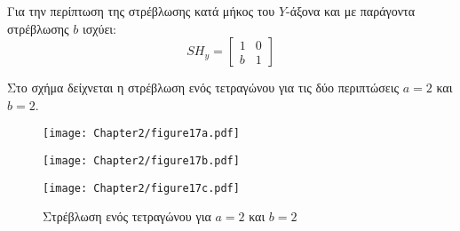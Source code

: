 \begin{solution}
Για την περίπτωση της στρέβλωσης κατά μήκος του $Y$-άξονα και με παράγοντα στρέβλωσης $b$ ισχύει:
\[
SH_y = \begin{bmatrix}
1 & 0 \\
b & 1
\end{bmatrix}
\]


Στο σχήμα  δείχνεται η στρέβλωση ενός τετραγώνου για τις δύο περιπτώσεις $a=2$ και $b=2$.

\begin{figure}[h!]
	\begin{center}
		\begin{minipage}[b]{0.19\textwidth} %
		    \texttt{[image: Chapter2/figure17a.pdf]}
		\end{minipage}%
	\hfill
		\begin{minipage}[b]{0.4\textwidth} %
		    \texttt{[image: Chapter2/figure17b.pdf]}
		\end{minipage}
	\hfill
		\begin{minipage}[b]{0.4\textwidth} %
		    \texttt{[image: Chapter2/figure17c.pdf]}
		\end{minipage}
	\end{center}
\caption{Στρέβλωση ενός τετραγώνου για $a=2$ και $b=2$}
\end{figure}

\end{solution}
